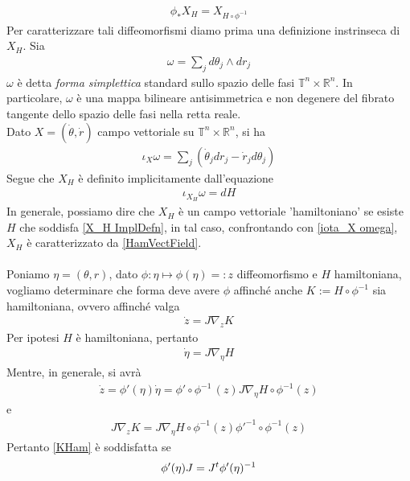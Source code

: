 \documentclass[twoside, 11pt]{amsbook}
\newcommand{\0}{{(0)}}
\newcommand{\3}{{(3)}}
\theoremstyle{colonplain}
\theoremstyle{colondefinition}
\theoremstyle{colonremark}
\numberwithin{equation}{chapter}
\begin{document}
\begin{align}\label{SymplMorph}
    \phi_*X_H = X_{H \circ \phi^{-1}} 
\end{align}
Per caratterizzare tali diffeomorfismi diamo prima una definizione instrinseca di $X_H$. Sia
\begin{align}
    \omega = \sum_j d\theta_j \wedge dr_j 
\end{align}
$\omega$ è detta \textit{forma simplettica} standard sullo spazio delle fasi $\mathbb{T}^n \times \mathbb{R}^n$. In particolare, $\omega$ è una mappa bilineare antisimmetrica e non degenere del fibrato tangente dello spazio delle fasi nella retta reale. \\
Dato $X = (\dot{\theta}, \dot{r})$ campo vettoriale su $\mathbb{T}^n \times \mathbb{R}^n$, si ha
\begin{align}\label{iota_X omega}
    \iota_X\omega = \sum_j (\dot{\theta}_jdr_j - \dot{r}_jd\theta_j) 
\end{align}
Segue che $X_H$ è definito implicitamente dall'equazione
\begin{align}\label{X_H ImplDefn}
    \iota_{X_H}\omega = dH 
\end{align}
In generale, possiamo dire che $X_H$ è un campo vettoriale 'hamiltoniano' se esiste $H$ che soddisfa \eqref{X_H ImplDefn}, in tal caso, confrontando con \eqref{iota_X omega}, $X_H$ è caratterizzato da \eqref{HamVectField}. \\ \\
Poniamo $\eta = (\theta, r)$, dato $\phi : \eta \mapsto \phi(\eta) =: z$ diffeomorfismo e $H$ hamiltoniana, vogliamo determinare che forma deve avere $\phi$ affinché anche $K := H \circ \phi^{-1}$ sia hamiltoniana, ovvero affinché valga
\begin{align}\label{KHam}
    \dot{z} = J\nabla_z K
\end{align}
Per ipotesi $H$ è hamiltoniana, pertanto
\begin{align}
    \dot{\eta} = J\nabla_\eta H
\end{align}
Mentre, in generale, si avrà
\begin{align}
    \dot{z} = \phi'(\eta)\dot{\eta} = \phi' \circ \phi^{-1} \, (z) J\nabla_\eta H \circ \phi^{-1}(z)
\end{align}
e
\begin{align}
    J\nabla_z K = J\nabla_\eta H \circ \phi^{-1}(z)\phi'^{-1} \circ \phi^{-1}(z)
\end{align}
Pertanto \eqref{KHam} è soddisfatta se
\begin{align}\label{SymplCond}
    \phi'(\eta)J = J\null^t\phi'(\eta)^{-1}
\end{align}
\end{document}
